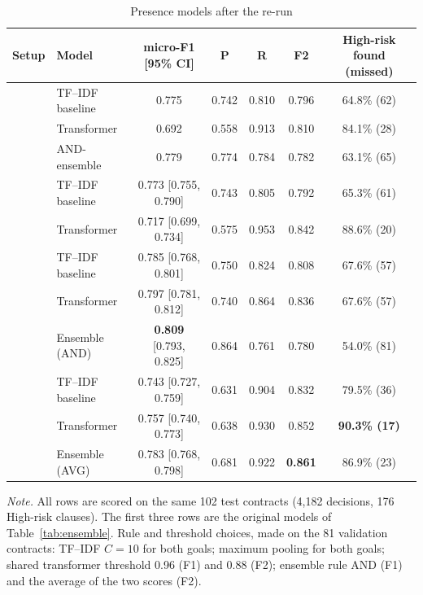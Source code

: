 \begin{table}[!htbp]
\centering
\caption{Presence models after the re-run}
\label{tab:v2}
\small
\begin{adjustbox}{max width=\textwidth}
\begin{tabular}{@{}l l c c c c c@{}}
\toprule
\textbf{Setup} & \textbf{Model} & \textbf{micro-F1 [95\% CI]} & \textbf{P} & \textbf{R} & \textbf{F2} & \textbf{High-risk found (missed)}\\
\midrule
{}
 & TF--IDF baseline & 0.775 & 0.742 & 0.810 & 0.796 & 64.8\% (62)\\
 & Transformer      & 0.692 & 0.558 & 0.913 & 0.810 & 84.1\% (28)\\
 & AND-ensemble     & 0.779 & 0.774 & 0.784 & 0.782 & 63.1\% (65)\\
\midrule
{}
 & TF--IDF baseline & 0.773 [0.755, 0.790] & 0.743 & 0.805 & 0.792 & 65.3\% (61)\\
 & Transformer      & 0.717 [0.699, 0.734] & 0.575 & 0.953 & 0.842 & 88.6\% (20)\\
\midrule
{}
 & TF--IDF baseline & 0.785 [0.768, 0.801] & 0.750 & 0.824 & 0.808 & 67.6\% (57)\\
 & Transformer      & 0.797 [0.781, 0.812] & 0.740 & 0.864 & 0.836 & 67.6\% (57)\\
 & Ensemble (AND)   & \textbf{0.809} [0.793, 0.825] & 0.864 & 0.761 & 0.780 & 54.0\% (81)\\
\midrule
{}
 & TF--IDF baseline & 0.743 [0.727, 0.759] & 0.631 & 0.904 & 0.832 & 79.5\% (36)\\
 & Transformer      & 0.757 [0.740, 0.773] & 0.638 & 0.930 & 0.852 & \textbf{90.3\% (17)}\\
 & Ensemble (AVG)   & 0.783 [0.768, 0.798] & 0.681 & 0.922 & \textbf{0.861} & 86.9\% (23)\\
\bottomrule
\end{tabular}
\end{adjustbox}

{\footnotesize\singlespacing \emph{Note.} All rows are scored on the same 102 test contracts (4{,}182 decisions, 176 High-risk clauses). The first three rows are the original models of Table~\ref{tab:ensemble}. Rule and threshold choices, made on the 81 validation contracts: TF--IDF $C = 10$ for both goals; maximum pooling for both goals; shared transformer threshold 0.96 (F1) and 0.88 (F2); ensemble rule AND (F1) and the average of the two scores (F2).\par}
\end{table}

